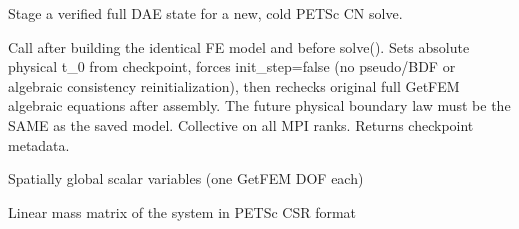 \documentclass[letterpaper,10pt,english]{sphinxmanual}
\begin{document}
\begin{fulllineitems}

\begin{fulllineitems}
\label{\detokenize{scrimp:scrimp.dphs.DPHS.load_checkpoint}}
\pysigstartsignatures
\pysiglinewithargsret
{}
{}
{}
\pysigstopsignatures
\sphinxAtStartPar
Stage a verified full DAE state for a new, cold PETSc CN solve.

\sphinxAtStartPar
Call after building the identical FE model and before solve().
Sets absolute physical t\_0 from checkpoint, forces init\_step=false
(no pseudo/BDF or algebraic consistency reinitialization), then
rechecks original full GetFEM algebraic equations after assembly.
The future physical boundary law must be the SAME as the saved
model. Collective on all MPI ranks. Returns checkpoint metadata.

\end{fulllineitems}


\begin{fulllineitems}
\label{\detokenize{scrimp:scrimp.dphs.DPHS.lumped_variables}}
\pysigstartsignatures
\pysigline
{}
\pysigstopsignatures
\sphinxAtStartPar
Spatially global scalar variables (one GetFEM DOF each)

\end{fulllineitems}


\begin{fulllineitems}
\label{\detokenize{scrimp:scrimp.dphs.DPHS.mass}}
\pysigstartsignatures
\pysigline
{}
\pysigstopsignatures
\sphinxAtStartPar
Linear mass matrix of the system in PETSc CSR format

\end{fulllineitems}



\end{fulllineitems}
\end{document}
